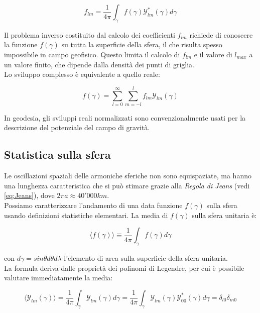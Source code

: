 \documentclass[a4paper,12pt]{book}
\begin{document}
\begin{equation}
    f_{lm} = \frac{1}{4\pi} \int_\gamma f(\gamma) \mathcal{Y}^*_{lm} (\gamma) d\gamma
\end{equation}

\noindent
Il problema inverso costituito dal calcolo dei coefficienti $f_{lm}$ richiede di conoscere la funzione $f(\gamma)$ su tutta la superficie della sfera, il che risulta spesso impossibile in campo geofisico. 
Questo limita il calcolo di $f_{lm}$ e il valore di $l_{max}$ a un valore finito, che dipende dalla densità dei punti di griglia.\\

\noindent
Lo sviluppo complesso è equivalente a quello reale:

\begin{equation}
    f(\gamma) = \sum_{l=0}^\infty \sum_{m=-l}^l f_{lm} \mathcal{Y}_{lm}(\gamma)
\end{equation}

\noindent
In geodesia, gli sviluppi reali normalizzati sono convenzionalmente usati per la descrizione del potenziale del campo di gravità.

\subsection{\textcolor{colore7}{Statistica sulla sfera}}

Le oscillazioni spaziali delle armoniche sferiche non sono equispaziate, ma hanno una lunghezza caratteristica che si può stimare grazie alla \textit{Regola di Jeans} (vedi \ref{eq:Jeans}), dove $2\pi a \approx 40'000 km$.\\

\noindent
Possiamo caratterizzare l'andamento di una data funzione $f(\gamma)$ sulla sfera usando definizioni statistiche elementari.
La media di $f(\gamma)$ sulla sfera unitaria è:

\begin{equation}
    \langle f (\gamma) \rangle \equiv \frac{1}{4 \pi} \int _\gamma f(\gamma) d\gamma
\end{equation}

\noindent 
con $d \gamma = sin \theta d \theta d \lambda $ l’elemento di area sulla superficie della sfera unitaria.\\
La formula deriva dalle proprietà dei polinomi di Legendre, per cui è possibile valutare immediatamente la media:

\begin{equation}
    \langle \mathcal{Y}_{lm} (\gamma) \rangle = \frac{1}{4 \pi} \int_\gamma \mathcal{Y}_{lm} (\gamma) d \gamma = \frac{1}{4 \pi} \int _\gamma \mathcal{Y}_{lm} (\gamma) \mathcal{Y}^*_{00} (\gamma) d \gamma = \delta _{l0} \delta _{m0}
\end{equation}
\end{document}
